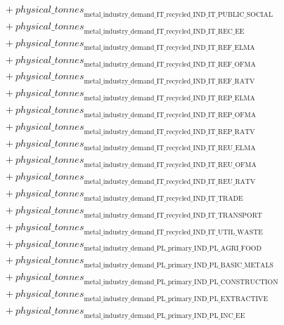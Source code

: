 \documentclass[11pt]{article}
\begin{document}
\begin{align*}
&\quad {}+ {physical\_tonnes}_{\text{metal\_industry\_demand\_IT\_recycled\_IND\_IT\_PUBLIC\_SOCIAL}}\\
&\quad {}+ {physical\_tonnes}_{\text{metal\_industry\_demand\_IT\_recycled\_IND\_IT\_REC\_EE}}\\
&\quad {}+ {physical\_tonnes}_{\text{metal\_industry\_demand\_IT\_recycled\_IND\_IT\_REF\_ELMA}}\\
&\quad {}+ {physical\_tonnes}_{\text{metal\_industry\_demand\_IT\_recycled\_IND\_IT\_REF\_OFMA}}\\
&\quad {}+ {physical\_tonnes}_{\text{metal\_industry\_demand\_IT\_recycled\_IND\_IT\_REF\_RATV}}\\
&\quad {}+ {physical\_tonnes}_{\text{metal\_industry\_demand\_IT\_recycled\_IND\_IT\_REP\_ELMA}}\\
&\quad {}+ {physical\_tonnes}_{\text{metal\_industry\_demand\_IT\_recycled\_IND\_IT\_REP\_OFMA}}\\
&\quad {}+ {physical\_tonnes}_{\text{metal\_industry\_demand\_IT\_recycled\_IND\_IT\_REP\_RATV}}\\
&\quad {}+ {physical\_tonnes}_{\text{metal\_industry\_demand\_IT\_recycled\_IND\_IT\_REU\_ELMA}}\\
&\quad {}+ {physical\_tonnes}_{\text{metal\_industry\_demand\_IT\_recycled\_IND\_IT\_REU\_OFMA}}\\
&\quad {}+ {physical\_tonnes}_{\text{metal\_industry\_demand\_IT\_recycled\_IND\_IT\_REU\_RATV}}\\
&\quad {}+ {physical\_tonnes}_{\text{metal\_industry\_demand\_IT\_recycled\_IND\_IT\_TRADE}}\\
&\quad {}+ {physical\_tonnes}_{\text{metal\_industry\_demand\_IT\_recycled\_IND\_IT\_TRANSPORT}}\\
&\quad {}+ {physical\_tonnes}_{\text{metal\_industry\_demand\_IT\_recycled\_IND\_IT\_UTIL\_WASTE}}\\
&\quad {}+ {physical\_tonnes}_{\text{metal\_industry\_demand\_PL\_primary\_IND\_PL\_AGRI\_FOOD}}\\
&\quad {}+ {physical\_tonnes}_{\text{metal\_industry\_demand\_PL\_primary\_IND\_PL\_BASIC\_METALS}}\\
&\quad {}+ {physical\_tonnes}_{\text{metal\_industry\_demand\_PL\_primary\_IND\_PL\_CONSTRUCTION}}\\
&\quad {}+ {physical\_tonnes}_{\text{metal\_industry\_demand\_PL\_primary\_IND\_PL\_EXTRACTIVE}}\\
&\quad {}+ {physical\_tonnes}_{\text{metal\_industry\_demand\_PL\_primary\_IND\_PL\_INC\_EE}}\\

\end{align*}
\end{document}
